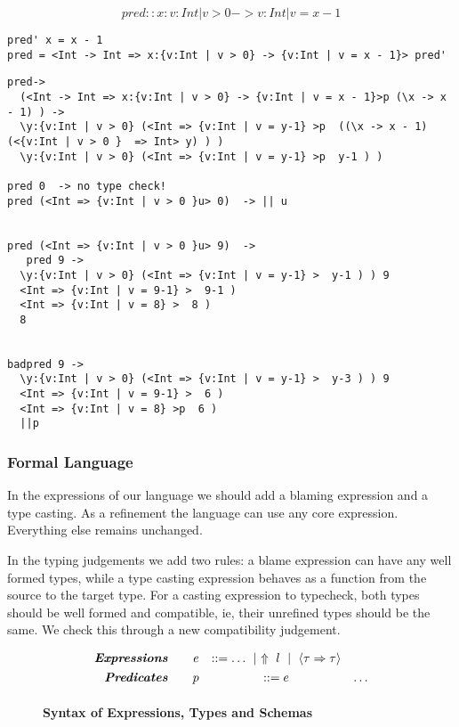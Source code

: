 $$
pred ::x:{v:Int | v > 0} -> {v:Int | v = x - 1} 
$$
\begin{verbatim}
pred' x = x - 1
pred = <Int -> Int => x:{v:Int | v > 0} -> {v:Int | v = x - 1}> pred'
\end{verbatim}

\begin{verbatim}
pred-> 
  (<Int -> Int => x:{v:Int | v > 0} -> {v:Int | v = x - 1}>p (\x -> x - 1) ) ->  
  \y:{v:Int | v > 0} (<Int => {v:Int | v = y-1} >p  ((\x -> x - 1) (<{v:Int | v > 0 }  => Int> y) ) ) 
  \y:{v:Int | v > 0} (<Int => {v:Int | v = y-1} >p  y-1 ) ) 
  
pred 0  -> no type check!
pred (<Int => {v:Int | v > 0 }u> 0)  -> || u


pred (<Int => {v:Int | v > 0 }u> 9)  -> 
   pred 9 -> 
  \y:{v:Int | v > 0} (<Int => {v:Int | v = y-1} >  y-1 ) ) 9
  <Int => {v:Int | v = 9-1} >  9-1 )
  <Int => {v:Int | v = 8} >  8 )
  8


badpred 9 -> 
  \y:{v:Int | v > 0} (<Int => {v:Int | v = y-1} >  y-3 ) ) 9
  <Int => {v:Int | v = 9-1} >  6 )
  <Int => {v:Int | v = 8} >p  6 )
  ||p

\end{verbatim}

\subsubsection{Formal Language}

In the expressions of our language we should add a blaming expression
and a type casting.
As a refinement the language can use any core expression.
Everything else remains unchanged.


In the typing judgements we add two rules:
a blame expression can have any well formed types, 
while a type casting expression behaves as a function from the 
source to the target type.
For a casting expression to typecheck, both types should be 
well formed and compatible, ie, their unrefined types should be 
the same. We check this through a new compatibility judgement.

\begin{figure}[t!]
\centering
$$
\begin{array}{rrcl}
\emphbf{Expressions} \quad 
  & e 
  & ::= \dots
  \spmid \elabel{l} 
  \spmid \ecast{\tau}{\tau} 
  \\[0.05in] 

\emphbf{Predicates} \quad 
  & p
  & ::= e
  & \dots
  \\[0.05in] 

\end{array}
$$
\caption{\textbf{Syntax of Expressions, Types and Schemas}}
\label{fig:syntax}
\end{figure}


